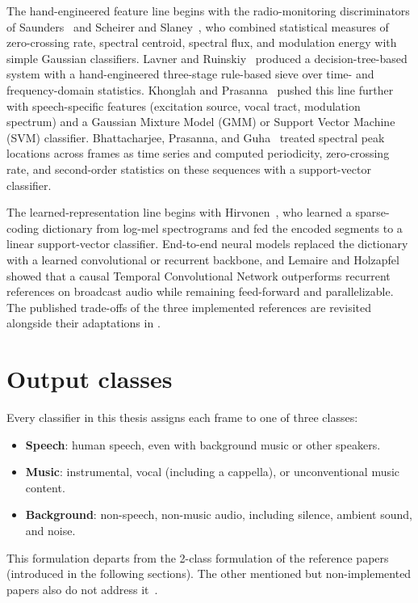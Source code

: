 The hand-engineered feature line begins with the radio-monitoring discriminators of Saunders~\cite{saunders1996realtime} and Scheirer and Slaney~\cite{scheirer1997discriminator}, who combined statistical measures of zero-crossing rate, spectral centroid, spectral flux, and modulation energy with simple Gaussian classifiers.
Lavner and Ruinskiy~\cite{lavner2009dt} produced a decision-tree-based system with a hand-engineered three-stage rule-based sieve over time- and frequency-domain statistics.
Khonglah and Prasanna~\cite{khonglah2016gmmsvm} pushed this line further with speech-specific features (excitation source, vocal tract, modulation spectrum) and a Gaussian Mixture Model (GMM) or Support Vector Machine (SVM) classifier.
Bhattacharjee, Prasanna, and Guha~\cite{bhattacharjee2018sps} treated spectral peak locations across frames as time series and computed periodicity, zero-crossing rate, and second-order statistics on these sequences with a support-vector classifier.

The learned-representation line begins with Hirvonen~\cite{hirvonen2014short}, who learned a sparse-coding dictionary from log-mel spectrograms and fed the encoded segments to a linear support-vector classifier.
End-to-end neural models replaced the dictionary with a learned convolutional or recurrent backbone, and Lemaire and Holzapfel~\cite{lemaire2019tcn} showed that a causal Temporal Convolutional Network outperforms recurrent references on broadcast audio while remaining feed-forward and parallelizable.
The published trade-offs of the three implemented references are revisited alongside their adaptations in .

\section{Output classes}
\label{sec:output_classes}

Every classifier in this thesis assigns each frame to one of three classes:
\begin{itemize}
    \item \textbf{Speech}: human speech, even with background music or other speakers.
    \item \textbf{Music}: instrumental, vocal (including a cappella), or unconventional music content.
    \item \textbf{Background}: non-speech, non-music audio, including silence, ambient sound, and noise.
\end{itemize}
This formulation departs from the 2-class formulation of the reference papers~\cite{lavner2009dt,khonglah2016gmmsvm,lemaire2019tcn} (introduced in the following sections).
The other mentioned but non-implemented papers also do not address it~\cite{bhattacharjee2018sps,hirvonen2014short}.


